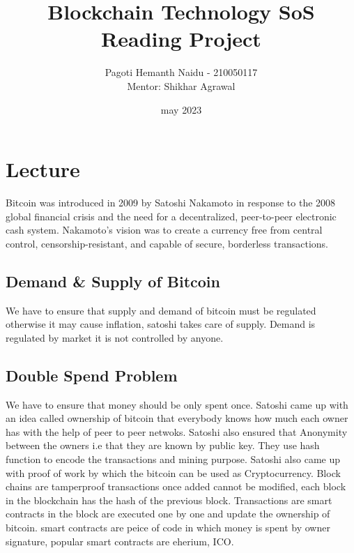 \documentclass{report}
\title{Blockchain Technology SoS Reading Project}
\author{Pagoti Hemanth Naidu - 210050117 \\
Mentor: Shikhar Agrawal}
\date{may 2023}
\begin{document}
\maketitle
\section{Lecture }

Bitcoin was introduced in 2009 by Satoshi Nakamoto in response to the 2008 global financial crisis and the need for a decentralized, peer-to-peer electronic cash system. 
Nakamoto's vision was to create a currency free from central control, censorship-resistant, and capable of secure, borderless transactions.
\subsection{Demand \& Supply of Bitcoin}
We have to ensure that supply and demand of bitcoin must be regulated otherwise it may cause inflation, satoshi takes care of supply.
Demand is regulated by market it is not controlled by anyone.
\subsection{Double Spend Problem}
We have to ensure that money should be only spent once.
Satoshi came up with an idea called ownership of bitcoin that everybody knows how much each owner has with the help of peer to peer netwoks.
Satoshi also ensured that Anonymity between the owners i.e that they are known by public key.
They use hash function to encode the transactions and mining purpose.
Satoshi also came up with proof of work by which the bitcoin can be used as Cryptocurrency.
Block chains are tamperproof transactions once added cannot be modified, each block in the blockchain has the hash of the previous block.
Transactions are smart contracts in the block are executed one by one and update the ownership of bitcoin.
smart contracts are peice of code in which money is spent by owner signature, popular smart contracts are eherium, ICO.
\end{document}
